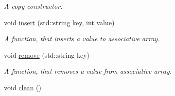 \begin{DoxyCompactItemize}
\begin{DoxyCompactList}\small\item\em A copy constructor. \end{DoxyCompactList}\item 
void \hyperlink{class_assoc_array_ab0031f87fe1843af6fb1248086610c6e}{insert} (std\-::string key, int value)
\begin{DoxyCompactList}\small\item\em A function, that inserts a value to associative array. \end{DoxyCompactList}\item 
void \hyperlink{class_assoc_array_a859a0a7f284c229c28c8581226f8bf0f}{remove} (std\-::string key)
\begin{DoxyCompactList}\small\item\em A function, that removes a value from associative array. \end{DoxyCompactList}\item 
\hypertarget{class_assoc_array_a1b83d24dd0ed8030f43ffa08db8c5942}{void \hyperlink{class_assoc_array_a1b83d24dd0ed8030f43ffa08db8c5942}{clean} ()}\label{class_assoc_array_a1b83d24dd0ed8030f43ffa08db8c5942}


\end{DoxyCompactItemize}
